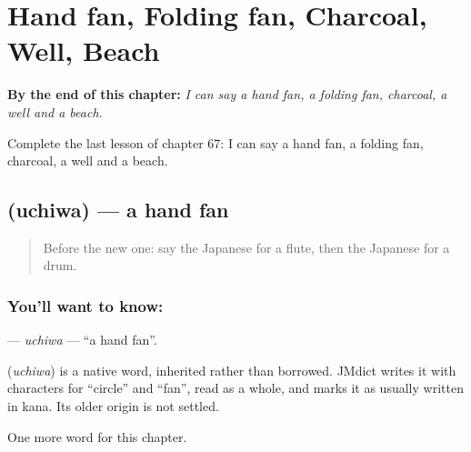 
\chapter{Hand fan, Folding fan, Charcoal, Well, Beach}
\label{ch:ja-hand-fan-folding-fan-charcoal-well-beach}

\begin{chapteropening}
\textbf{By the end of this chapter:} \emph{I can say a hand fan, a folding fan, charcoal, a well and a beach.}

Complete the last lesson of chapter 67: I can say a hand fan, a folding fan, charcoal, a well and a beach.
\end{chapteropening}

\section[\texorpdfstring{\ja{うちわ} (uchiwa)}{うちわ (uchiwa)}]{ (uchiwa) — a hand fan}

\label{lesson:JA-C67-uchiwa}



\begin{quote}
Before the new one: say the Japanese for a flute, then the Japanese for a drum.
\end{quote}

\subsection*{You'll want to know: }
\textbf{} — \emph{uchiwa} — \textquotedblleft{}a hand fan\textquotedblright{}.

\begin{cousinweb}
\textbf{} (\emph{uchiwa}) is a native word, inherited rather than borrowed. JMdict writes it with characters for \textquotedblleft{}circle\textquotedblright{} and \textquotedblleft{}fan\textquotedblright{}, read as a whole, and marks it as usually written in kana. Its older origin is not settled.
\end{cousinweb}

\begin{grammarlens}[title={What you've built}]
One more word for this chapter.
\end{grammarlens}


